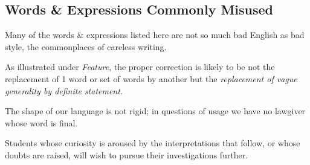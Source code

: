 \documentclass{article}
\begin{document}

\subsection{Words \& Expressions Commonly Misused}
Many of the words \& expressions listed here are not so much bad English as bad style, the commonplaces of careless writing.

As illustrated under {\it Feature}, the proper correction is likely to be not the replacement of 1 word or set of words by another but the {\it replacement of vague generality by definite statement}.

%
The shape of our language is not rigid; in questions of usage we have no lawgiver whose word is final.

Students whose curiosity is aroused by the interpretations that follow, or whose doubts are raised, will wish to pursue their investigations further.
\end{document}
